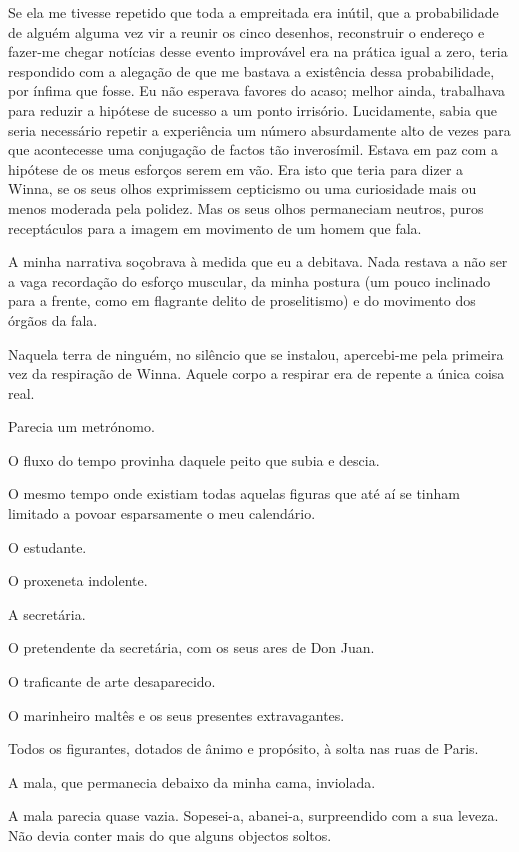 Se ela me
tivesse repetido que toda a empreitada era inútil, que a probabilidade de alguém alguma vez vir a reunir os cinco
desenhos, reconstruir o endereço e fazer-me chegar notícias desse evento
improvável era na prática igual a zero, teria respondido com a alegação
de que me bastava a existência dessa probabilidade, por ínfima que
fosse. Eu não esperava favores do acaso; melhor ainda, trabalhava para
reduzir a hipótese de sucesso a um ponto irrisório. Lucidamente, sabia
que seria necessário repetir a experiência um número absurdamente alto
de vezes para que acontecesse uma conjugação de factos tão inverosímil.
Estava em paz com a hipótese de os meus esforços serem em vão. Era isto
que teria para dizer a Winna, se os seus olhos exprimissem cepticismo ou
uma curiosidade mais ou menos moderada pela polidez. Mas os seus olhos
permaneciam neutros, puros receptáculos para a imagem em movimento de um
homem que fala.

A minha narrativa soçobrava à medida que eu a debitava. Nada restava a
não ser a vaga recordação do esforço muscular, da minha postura (um
pouco inclinado para a frente, como em flagrante delito de proselitismo)
e do movimento dos órgãos da fala.

Naquela terra de ninguém, no silêncio que se instalou, apercebi-me pela
primeira vez da respiração de Winna. Aquele
corpo a respirar era de repente a única coisa real.

Parecia um metrónomo.

O fluxo do tempo provinha daquele peito que subia e descia.

O mesmo tempo onde existiam todas aquelas figuras que até aí se tinham
limitado a povoar esparsamente o meu calendário.

O estudante.

O proxeneta indolente.

A secretária.

O pretendente da secretária, com os seus ares de Don Juan.

O traficante
de arte desaparecido.

O marinheiro maltês e os seus presentes extravagantes.

Todos os figurantes, dotados de ânimo e propósito, à solta nas ruas de
Paris.

A mala, que permanecia debaixo da minha cama, inviolada.

A mala parecia
quase vazia. Sopesei-a, abanei-a, surpreendido com a sua leveza. Não
devia conter mais do que alguns
objectos soltos.

